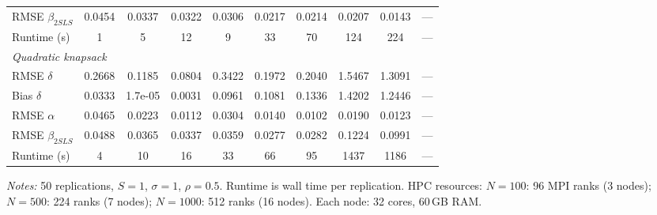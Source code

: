 \begin{table}[htbp]
\begin{tabular}{l c c c c c c c c c}
RMSE $\beta_{2SLS}$ & 0.0454 & 0.0337 & 0.0322 & 0.0306 & 0.0217 & 0.0214 & 0.0207 & 0.0143 & --- \\
Runtime (s) & 1 & 5 & 12 & 9 & 33 & 70 & 124 & 224 & --- \\[4pt]
\multicolumn{10}{l}{\textit{Quadratic knapsack}} \\[2pt]
RMSE $\delta$ & 0.2668 & 0.1185 & 0.0804 & 0.3422 & 0.1972 & 0.2040 & 1.5467 & 1.3091 & --- \\
Bias $\delta$ & 0.0333 & 1.7e-05 & 0.0031 & 0.0961 & 0.1081 & 0.1336 & 1.4202 & 1.2446 & --- \\
RMSE $\alpha$ & 0.0465 & 0.0223 & 0.0112 & 0.0304 & 0.0140 & 0.0102 & 0.0190 & 0.0123 & --- \\
RMSE $\beta_{2SLS}$ & 0.0488 & 0.0365 & 0.0337 & 0.0359 & 0.0277 & 0.0282 & 0.1224 & 0.0991 & --- \\
Runtime (s) & 4 & 10 & 16 & 33 & 66 & 95 & 1437 & 1186 & --- \\[4pt]
\bottomrule
\end{tabular}
\begin{tablenotes}
\footnotesize
\item \textit{Notes:} 50 replications, $S=1$, $\sigma=1$, $\rho=0.5$. Runtime is wall time per replication. HPC resources: $N=100$: 96 MPI ranks (3 nodes); $N=500$: 224 ranks (7 nodes); $N=1000$: 512 ranks (16 nodes). Each node: 32 cores, 60\,GB RAM.
\end{tablenotes}
\end{table}
